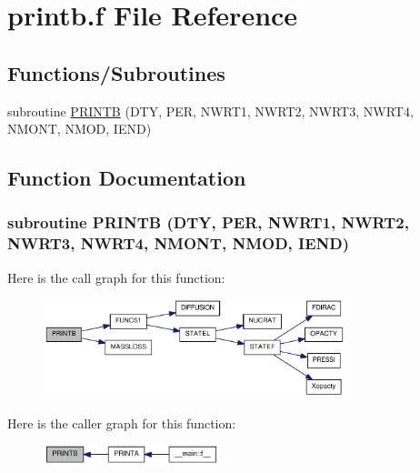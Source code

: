 \hypertarget{printb_8f}{
\section{printb.f File Reference}
\label{printb_8f}
}
\subsection*{Functions/Subroutines}
\begin{DoxyCompactItemize}
\item 
subroutine \hyperlink{printb_8f_aa84cd59593658bd5afe3681edf41ad12}{PRINTB} (DTY, PER, NWRT1, NWRT2, NWRT3, NWRT4, NMONT, NMOD, IEND)
\end{DoxyCompactItemize}


\subsection{Function Documentation}
\hypertarget{printb_8f_aa84cd59593658bd5afe3681edf41ad12}{
\subsubsection[{PRINTB}]{\setlength{\rightskip}{0pt plus 5cm}subroutine PRINTB (DTY, \/  PER, \/  NWRT1, \/  NWRT2, \/  NWRT3, \/  NWRT4, \/  NMONT, \/  NMOD, \/  IEND)}}
\label{printb_8f_aa84cd59593658bd5afe3681edf41ad12}


Here is the call graph for this function:\nopagebreak
\begin{figure}[H]
\begin{center}
\leavevmode
\includegraphics[width=249pt]{printb_8f_aa84cd59593658bd5afe3681edf41ad12_cgraph}
\end{center}
\end{figure}


Here is the caller graph for this function:\nopagebreak
\begin{figure}[H]
\begin{center}
\leavevmode
\includegraphics[width=145pt]{printb_8f_aa84cd59593658bd5afe3681edf41ad12_icgraph}
\end{center}
\end{figure}
